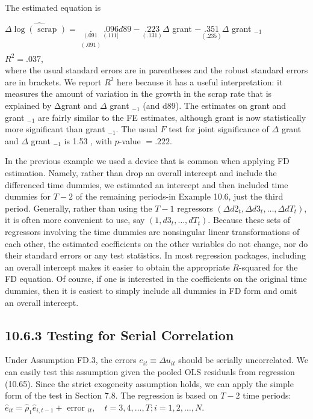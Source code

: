 \documentclass[10pt]{article}
\begin{document}
The estimated equation is

$\Delta \widehat{\log (\text { scrap })}=\underset{\substack{(.091) \\[.088]}}{\underset{(.091}{.}} \underset{(.111]}{.096} d 89-\underset{(.131)}{.223} \Delta$ grant $-\underset{(.235)}{.351} \Delta$ grant $_{-1}$\\
$R^{2}=.037$,\\
where the usual standard errors are in parentheses and the robust standard errors are in brackets. We report $R^{2}$ here because it has a useful interpretation: it measures the amount of variation in the growth in the scrap rate that is explained by Δgrant and $\Delta$ grant $_{-1}$ (and d89). The estimates on grant and grant $_{-1}$ are fairly similar to the FE estimates, although grant is now statistically more significant than grant ${ }_{-1}$. The usual $F$ test for joint significance of $\Delta$ grant and $\Delta$ grant $_{-1}$ is 1.53 , with $p$-value $=.222$.

In the previous example we used a device that is common when applying FD estimation. Namely, rather than drop an overall intercept and include the differenced time dummies, we estimated an intercept and then included time dummies for $T-2$ of the remaining periods-in Example 10.6, just the third period. Generally, rather than using the $T-1$ regressors $\left(\Delta d 2_{t}, \Delta d 3_{t}, \ldots, \Delta d T_{t}\right)$, it is often more convenient to use, say $\left(1, d 3_{t}, \ldots, d T_{t}\right)$. Because these sets of regressors involving the time dummies are nonsingular linear transformations of each other, the estimated coefficients on the other variables do not change, nor do their standard errors or any test statistics. In most regression packages, including an overall intercept makes it easier to obtain the appropriate $R$-squared for the FD equation. Of course, if one is interested in the coefficients on the original time dummies, then it is easiest to simply include all dummies in FD form and omit an overall intercept.

\subsection*{10.6.3 Testing for Serial Correlation}
Under Assumption FD.3, the errors $e_{i t} \equiv \Delta u_{i t}$ should be serially uncorrelated. We can easily test this assumption given the pooled OLS residuals from regression\\
(10.65). Since the strict exogeneity assumption holds, we can apply the simple form of the test in Section 7.8. The regression is based on $T-2$ time periods:\\
$\hat{e}_{i t}=\hat{\rho}_{1} \hat{e}_{i, t-1}+$ error $_{i t}, \quad t=3,4, \ldots, T ; i=1,2, \ldots, N$.
\end{document}
